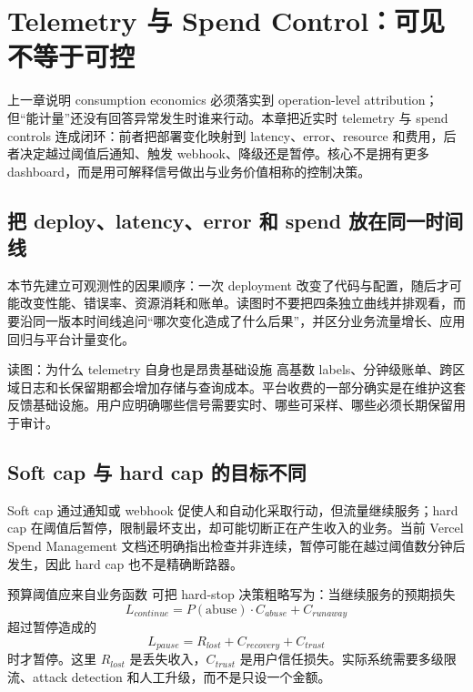 \section{Telemetry 与 Spend Control：可见不等于可控}

上一章说明 consumption economics 必须落实到 operation-level attribution；但“能计量”还没有回答异常发生时谁来行动。本章把近实时 telemetry 与 spend controls 连成闭环：前者把部署变化映射到 latency、error、resource 和费用，后者决定越过阈值后通知、触发 webhook、降级还是暂停。核心不是拥有更多 dashboard，而是用可解释信号做出与业务价值相称的控制决策。

\subsection{把 deploy、latency、error 和 spend 放在同一时间线}

本节先建立可观测性的因果顺序：一次 deployment 改变了代码与配置，随后才可能改变性能、错误率、资源消耗和账单。读图时不要把四条独立曲线并排观看，而要沿同一版本时间线追问“哪次变化造成了什么后果”，并区分业务流量增长、应用回归与平台计量变化。


\begin{knowledgebox}{读图：为什么 telemetry 自身也是昂贵基础设施}
高基数 labels、分钟级账单、跨区域日志和长保留期都会增加存储与查询成本。平台收费的一部分确实是在维护这套反馈基础设施。用户应明确哪些信号需要实时、哪些可采样、哪些必须长期保留用于审计。
\end{knowledgebox}

\subsection{Soft cap 与 hard cap 的目标不同}

Soft cap 通过通知或 webhook 促使人和自动化采取行动，但流量继续服务；hard cap 在阈值后暂停，限制最坏支出，却可能切断正在产生收入的业务。当前 Vercel Spend Management 文档还明确指出检查并非连续，暂停可能在越过阈值数分钟后发生，因此 hard cap 也不是精确断路器。


\begin{importantbox}{预算阈值应来自业务函数}
可把 hard-stop 决策粗略写为：当继续服务的预期损失
\[
L_{continue}=P(\text{abuse})\cdot C_{abuse}+C_{runaway}
\]
超过暂停造成的
\[
L_{pause}=R_{lost}+C_{recovery}+C_{trust}
\]
时才暂停。这里 $R_{lost}$ 是丢失收入，$C_{trust}$ 是用户信任损失。实际系统需要多级限流、attack detection 和人工升级，而不是只设一个金额。
\end{importantbox}

